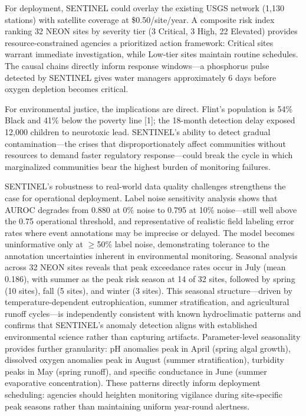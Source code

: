 \documentclass[12pt]{article}
\begin{document}
For deployment, SENTINEL could overlay the existing USGS network (1,130 stations) with satellite coverage at \$0.50/site/year. A composite risk index ranking 32 NEON sites by severity tier (3 Critical, 3 High, 22 Elevated) provides resource-constrained agencies a prioritized action framework: Critical sites warrant immediate investigation, while Low-tier sites maintain routine schedules. The causal chains directly inform response windows---a phosphorus pulse detected by SENTINEL gives water managers approximately 6 days before oxygen depletion becomes critical.

For environmental justice, the implications are direct. Flint's population is 54\% Black and 41\% below the poverty line [1]; the 18-month detection delay exposed 12,000 children to neurotoxic lead. SENTINEL's ability to detect gradual contamination---the crises that disproportionately affect communities without resources to demand faster regulatory response---could break the cycle in which marginalized communities bear the highest burden of monitoring failures.

SENTINEL's robustness to real-world data quality challenges strengthens the case for operational deployment. Label noise sensitivity analysis shows that AUROC degrades from 0.880 at 0\% noise to 0.795 at 10\% noise---still well above the 0.75 operational threshold, and representative of realistic field labeling error rates where event annotations may be imprecise or delayed. The model becomes uninformative only at $\geq$50\% label noise, demonstrating tolerance to the annotation uncertainties inherent in environmental monitoring. Seasonal analysis across 32 NEON sites reveals that peak exceedance rates occur in July (mean 0.186), with summer as the peak risk season at 14 of 32 sites, followed by spring (10 sites), fall (5 sites), and winter (3 sites). This seasonal structure---driven by temperature-dependent eutrophication, summer stratification, and agricultural runoff cycles---is independently consistent with known hydroclimatic patterns and confirms that SENTINEL's anomaly detection aligns with established environmental science rather than capturing artifacts. Parameter-level seasonality provides further granularity: pH anomalies peak in April (spring algal growth), dissolved oxygen anomalies peak in August (summer stratification), turbidity peaks in May (spring runoff), and specific conductance in June (summer evaporative concentration). These patterns directly inform deployment scheduling: agencies should heighten monitoring vigilance during site-specific peak seasons rather than maintaining uniform year-round alertness.
\end{document}
